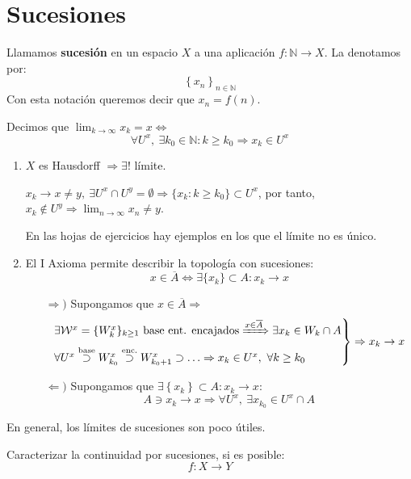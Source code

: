 \section{Sucesiones}
\label{sub:sucesiones}
\begin{defi}[Sucesiones]
Llamamos \textbf{sucesión} en un espacio $X$ a una aplicación $f: \mathbb{N} \rightarrow X$. La denotamos por:
\[
\left\{ x_n \right\}_{n \in \mathbb{N}}
\]
Con esta notación queremos decir que $x_n = f\left( n \right)$.
\end{defi}
\begin{defi}[Límites]
Decimos que $\lim_{k \rightarrow \infty} x_k = x \Leftrightarrow$ 
\[
\forall U^x,\ \exists k_0 \in \mathbb{N}: k \ge k_0 \Rightarrow x_k \in U^x
\]
\end{defi}
\begin{obs}
\begin{enumerate}
    \item $X$ es Hausdorff $\Rightarrow \exists! $ límite. 
    \begin{demo}    
    $x_k \rightarrow x \neq y,\ \exists U^x \cap U^y = \emptyset \Rightarrow \{x_k : k \ge k_0\} \subset U^x$, por tanto, $x_k \not\in U^y \Rightarrow \lim_{n \rightarrow \infty} x_n \neq y$.
    \end{demo}
    En las hojas de ejercicios hay ejemplos en los que el límite no es único.

    \item El I Axioma permite describir la topología con sucesiones:
    \[
     x \in \overline{A} \Leftrightarrow \exists \{x_k\} \subset A: x_k \rightarrow x
    \]

    \begin{demo}
    \begin{itemize}
        \item[$\Rightarrow)$] Supongamos que $x \in \overline{A} \Rightarrow$
        \[
        \begin{rcases}
            \exists \mathcal{W}^x = \{W_k^x\}_{k \ge 1} \text{ base ent. encajados} \xRightarrow{x \in \overline{A}} \exists x_k \in W_k \cap A\\
            \forall U^x \stackrel{\text{base}}{\supset} W_{k_0}^x \stackrel{\text{enc.}}{\supset} W_{k_0 + 1}^x \supset \ldots \Rightarrow x_k \in U^x,\ \forall k \ge k_0  
        \end{rcases} \Rightarrow x_k \rightarrow x
        \]
        \item[$\Leftarrow)$] Supongamos que $\exists \left\{ x_k \right\} \subset A: x_k \rightarrow x$:
        \[
        A \ni x_k \rightarrow x \Rightarrow \forall U^x,\ \exists x_{k_0} \in U^x \cap A
        \]
    \end{itemize}
    \end{demo}
\end{enumerate}
En general, los límites de sucesiones son poco útiles.
\end{obs}

\begin{enun}
Caracterizar la continuidad por sucesiones, si es posible:
\[
f: X \rightarrow Y
\]
\end{enun}


